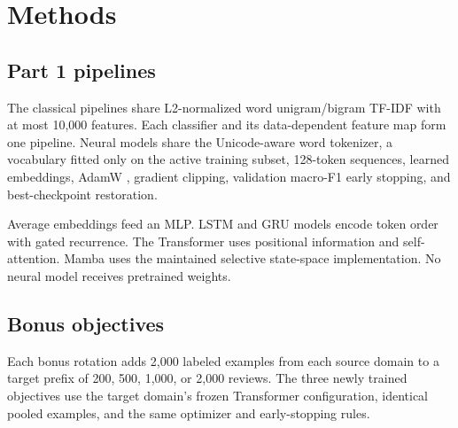 \section{Methods}

\subsection{Part 1 pipelines}



The classical pipelines share L2-normalized word unigram/bigram TF-IDF with at most 10,000 features. Each classifier and its data-dependent feature map form one pipeline. Neural models share the Unicode-aware word tokenizer, a vocabulary fitted only on the active training subset, 128-token sequences, learned embeddings, AdamW \citep{loshchilov2019decoupled}, gradient clipping, validation macro-F1 early stopping, and best-checkpoint restoration.

Average embeddings feed an MLP. LSTM and GRU models encode token order with gated recurrence. The Transformer uses positional information and self-attention. Mamba uses the maintained selective state-space implementation. No neural model receives pretrained weights.

\subsection{Bonus objectives}

Each bonus rotation adds 2,000 labeled examples from each source domain to a target prefix of 200, 500, 1,000, or 2,000 reviews. The three newly trained objectives use the target domain's frozen Transformer configuration, identical pooled examples, and the same optimizer and early-stopping rules.

